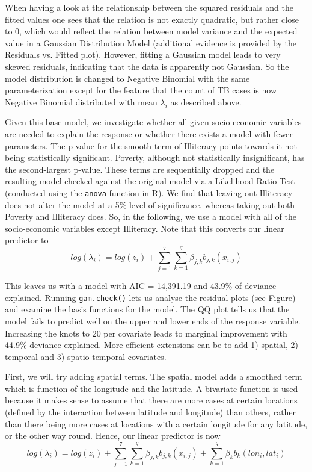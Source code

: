 When having a look at the relationship between the squared residuals and the fitted values one sees that the relation is not exactly quadratic, but rather close to 0, which would reflect the relation between model variance and the expected value in a Gaussian Distribution Model (additional evidence is provided by the Residuals vs. Fitted plot). However, fitting a Gaussian model leads to very skewed residuals, indicating that the data is apparently not Gaussian. So the model distribution is changed to Negative Binomial with the same parameterization except for the feature that the count of TB cases is now Negative Binomial distributed with mean $\lambda_{i}$ as described above.


Given this base model, we investigate whether all given socio-economic variables are needed to explain the response or whether there exists a model with fewer parameters. The p-value for the smooth term of Illiteracy points towards it not being statistically significant. Poverty, although not statistically insignificant, has the second-largest p-value. These terms are sequentially dropped and the resulting model checked against the original model via a Likelihood Ratio Test (conducted using the \texttt{anova} function in R). We find that leaving out Illiteracy does not alter the model at a 5\%-level of significance, whereas taking out both Poverty and Illiteracy does. So, in the following, we use a model with all of the socio-economic variables except Illiteracy. Note that this converts our linear predictor to 
$$
log(\lambda_i) = log(z_i) +  \sum_{j=1}^{7}\sum_{k=1}^{q}\beta_{j,k}b_{j,k}(x_{i,j})
$$


This leaves us with a model with AIC = 14,391.19 and 43.9\% of deviance explained. Running \texttt{gam.check()} lets us analyse the residual plots (see Figure) and examine the basis functions for the model. The QQ plot tells us that the model fails to predict well on the upper and lower ends of the response variable. Increasing the knots to 20 per covariate leads to marginal improvement with 44.9\% deviance explained. More efficient extensions can be to add 1) spatial, 2) temporal and 3) spatio-temporal covariates.


First, we will try adding spatial terms. The spatial model adds a smoothed term which is function of the longitude and the latitude. A bivariate function is used because it makes sense to assume that there are more cases at certain locations (defined by the interaction between latitude and longitude) than others, rather than there being more cases at
locations with a certain longitude for any latitude, or the other way round. Hence, our linear predictor is now
$$
log(\lambda_i) = log(z_i) +  \sum_{j=1}^{7}\sum_{k=1}^{q}\beta_{j,k}b_{j,k}(x_{i,j}) + \sum_{k=1}^{q}\beta_{k}b_{k}(lon_i , lat_i) 
$$


